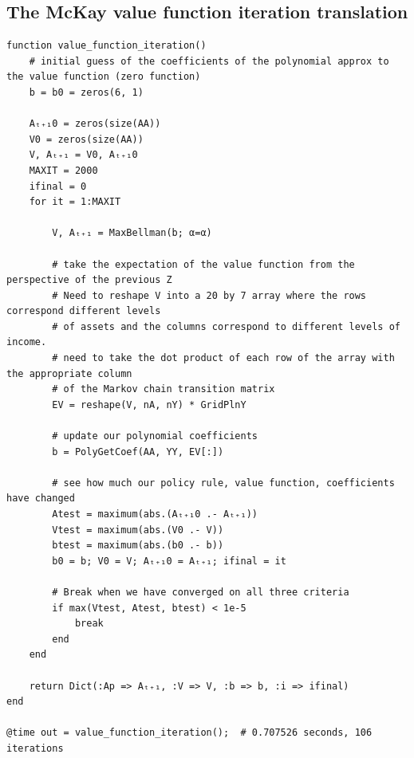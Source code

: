 \documentclass[12pt]{article}
\begin{document}
\subsection*{The McKay value function iteration translation}
\begin{lstlisting}[language=JuliaLocal, style=julia]
function value_function_iteration()
    # initial guess of the coefficients of the polynomial approx to the value function (zero function)
    b = b0 = zeros(6, 1)

    Aₜ₊₁0 = zeros(size(AA))
    V0 = zeros(size(AA))
    V, Aₜ₊₁ = V0, Aₜ₊₁0
    MAXIT = 2000
    ifinal = 0
    for it = 1:MAXIT

        V, Aₜ₊₁ = MaxBellman(b; α=α)

        # take the expectation of the value function from the perspective of the previous Z
        # Need to reshape V into a 20 by 7 array where the rows correspond different levels
        # of assets and the columns correspond to different levels of income.
        # need to take the dot product of each row of the array with the appropriate column 
        # of the Markov chain transition matrix
        EV = reshape(V, nA, nY) * GridPlnY

        # update our polynomial coefficients
        b = PolyGetCoef(AA, YY, EV[:])

        # see how much our policy rule, value function, coefficients have changed
        Atest = maximum(abs.(Aₜ₊₁0 .- Aₜ₊₁))
        Vtest = maximum(abs.(V0 .- V))
        btest = maximum(abs.(b0 .- b))
        b0 = b; V0 = V; Aₜ₊₁0 = Aₜ₊₁; ifinal = it

        # Break when we have converged on all three criteria
        if max(Vtest, Atest, btest) < 1e-5
            break
        end
    end

    return Dict(:Ap => Aₜ₊₁, :V => V, :b => b, :i => ifinal)
end

@time out = value_function_iteration();  # 0.707526 seconds, 106 iterations
\end{lstlisting}



\newpage
\end{document}
